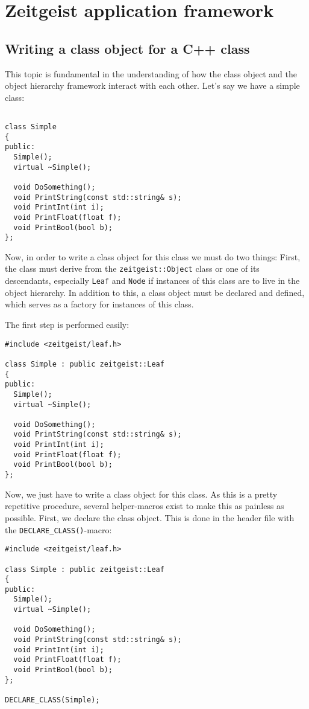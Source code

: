 \chapter{Zeitgeist application framework}

\section{Writing a class object for a C++ class}

This topic is fundamental in the understanding of how the class object
and the object hierarchy framework interact with each other. Let's say
we have a simple class:

\begin{verbatim}

class Simple
{
public:
  Simple();
  virtual ~Simple();
  
  void DoSomething();
  void PrintString(const std::string& s);
  void PrintInt(int i);
  void PrintFloat(float f);
  void PrintBool(bool b);
};

\end{verbatim}

Now, in order to write a class object for this class we must do two
things: First, the class must derive from the
\texttt{zeitgeist::Object} class or one of its descendants,
especially \texttt{Leaf} and \texttt{Node} if instances of this class
are to live in the object hierarchy. In addition to this, a class
object must be declared and defined, which serves as a factory for
instances of this class.

The first step is performed easily:

\begin{verbatim}
#include <zeitgeist/leaf.h>

class Simple : public zeitgeist::Leaf
{
public:
  Simple();
  virtual ~Simple();
  
  void DoSomething();
  void PrintString(const std::string& s);
  void PrintInt(int i);
  void PrintFloat(float f);
  void PrintBool(bool b);
};
\end{verbatim}

Now, we just have to write a class object for this class. As this is a
pretty repetitive procedure, several helper-macros exist to make this
as painless as possible. First, we declare the class object. This is
done in the header file with the \texttt{DECLARE\_CLASS()}-macro:

\begin{verbatim}
#include <zeitgeist/leaf.h>

class Simple : public zeitgeist::Leaf
{
public:
  Simple();
  virtual ~Simple();
  
  void DoSomething();
  void PrintString(const std::string& s);
  void PrintInt(int i);
  void PrintFloat(float f);
  void PrintBool(bool b);
};

DECLARE_CLASS(Simple);
\end{verbatim}

